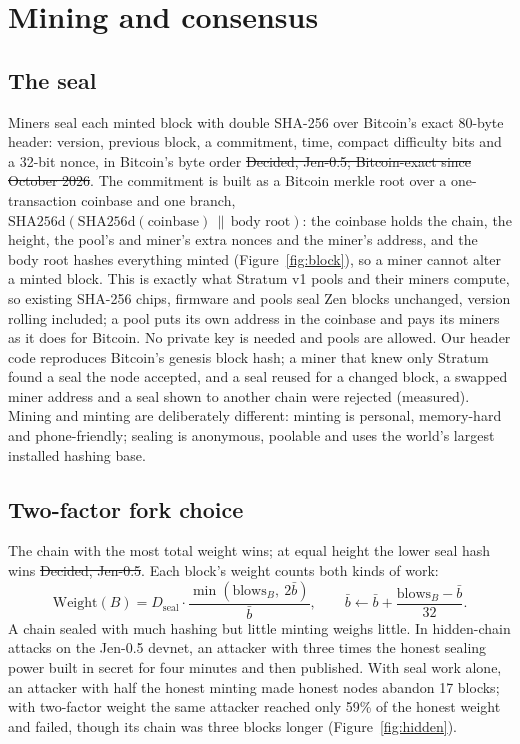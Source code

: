 \section{Mining and consensus}\label{sec:mining}

\subsection{The seal}
Miners seal each minted block with double SHA-256 over Bitcoin's exact 80-byte header: version, previous block, a commitment, time, compact difficulty bits and a 32-bit nonce, in Bitcoin's byte order \st{Decided, Jen-0.5; Bitcoin-exact since October 2026}. The commitment is built as a Bitcoin merkle root over a one-transaction coinbase and one branch, $\mathrm{SHA256d}(\mathrm{SHA256d}(\text{coinbase})\,\|\,\text{body root})$: the coinbase holds the chain, the height, the pool's and miner's extra nonces and the miner's address, and the body root hashes everything minted (Figure~\ref{fig:block}), so a miner cannot alter a minted block. This is exactly what Stratum v1 pools and their miners compute, so existing SHA-256 chips, firmware and pools seal Zen blocks unchanged, version rolling included; a pool puts its own address in the coinbase and pays its miners as it does for Bitcoin. No private key is needed and pools are allowed. Our header code reproduces Bitcoin's genesis block hash; a miner that knew only Stratum found a seal the node accepted, and a seal reused for a changed block, a swapped miner address and a seal shown to another chain were rejected (measured). Mining and minting are deliberately different: minting is personal, memory-hard and phone-friendly; sealing is anonymous, poolable and uses the world's largest installed hashing base.

\subsection{Two-factor fork choice}
The chain with the most total weight wins; at equal height the lower seal hash wins \st{Decided, Jen-0.5}. Each block's weight counts both kinds of work:
\begin{equation}
\mathrm{Weight}(B) = D_{\mathrm{seal}}\cdot\frac{\min(\mathrm{blows}_B,\ 2\bar b)}{\bar b},\qquad \bar b \leftarrow \bar b + \frac{\mathrm{blows}_B - \bar b}{32}.
\end{equation}
A chain sealed with much hashing but little minting weighs little. In hidden-chain attacks on the Jen-0.5 devnet, an attacker with three times the honest sealing power built in secret for four minutes and then published. With seal work alone, an attacker with half the honest minting made honest nodes abandon 17 blocks; with two-factor weight the same attacker reached only 59\% of the honest weight and failed, though its chain was three blocks longer (Figure~\ref{fig:hidden}).

